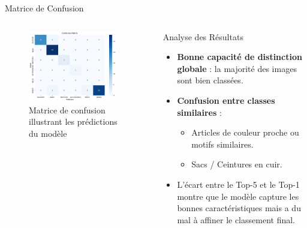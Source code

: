 \documentclass{beamer}
\begin{document}
\begin{frame}{Matrice de Confusion}
\begin{columns}[T]
    \begin{column}{0.5\textwidth}
        \vspace{0.5cm}
        \begin{figure}
            \centering
            \includegraphics[width=0.9\textwidth]{assets/confusion_matrix.png} %
            \caption{Matrice de confusion illustrant les prédictions du modèle}
        \end{figure}
    \end{column}

    \begin{column}{0.5\textwidth}
        \begin{block}{Analyse des Résultats}
            \begin{itemize}
                \item \textbf{Bonne capacité de distinction globale} : la majorité des images sont bien classées.
                \item \textbf{Confusion entre classes similaires} :
                \begin{itemize}
                    \item Articles de couleur proche ou motifs similaires.
                    \item Sacs / Ceintures en cuir.
                \end{itemize}
                \item L'écart entre le Top-5 et le Top-1 montre que le modèle capture les bonnes caractéristiques mais a du mal à affiner le classement final.
            \end{itemize}
        \end{block}
    \end{column}
\end{columns}
\end{frame}
\end{document}
